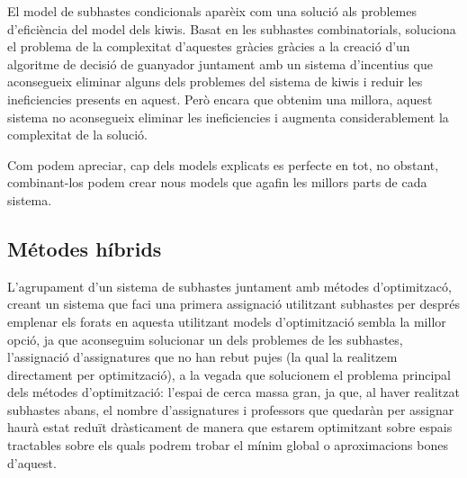 \documentclass[10pt,twocolumn]{article}
\begin{document}
	El model de subhastes condicionals aparèix com una solució als problemes d'eficiència del model dels kiwis. Basat en les subhastes combinatorials, soluciona el problema de la complexitat d'aquestes gràcies gràcies a la creació d'un algoritme de decisió de guanyador juntament amb un sistema d'incentius que aconsegueix eliminar alguns dels problemes del sistema de kiwis i reduir les ineficiencies presents en aquest. Però encara que obtenim una millora, aquest sistema no aconsegueix eliminar les ineficiencies i augmenta considerablement la complexitat de la solució.
	
	Com podem apreciar, cap dels models explicats es perfecte en tot, no obstant, combinant-los podem crear nous models que agafin les millors parts de cada sistema.
	
	\subsection{Métodes híbrids}
	L'agrupament d'un sistema de subhastes juntament amb métodes d'optimitzacó, creant un sistema que faci una primera assignació utilitzant subhastes per després emplenar els forats en aquesta utilitzant models d'optimització sembla la millor opció, ja que aconseguim solucionar un dels problemes de les subhastes, l'assignació d'assignatures que no han rebut pujes (la qual la realitzem directament per optimització), a la vegada que solucionem el problema principal dels métodes d'optimització: l'espai de cerca massa gran, ja que, al haver realitzat subhastes abans, el nombre d'assignatures i professors que quedaràn per assignar haurà estat reduït dràsticament de manera que estarem optimitzant sobre espais tractables sobre els quals podrem trobar el mínim global o aproximacions bones d'aquest.
	
\end{document}

